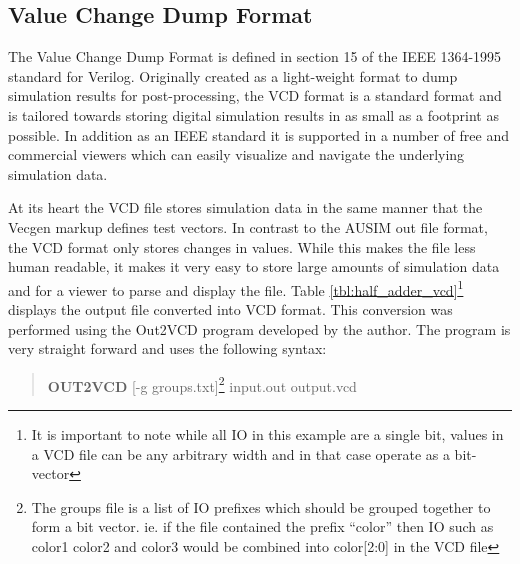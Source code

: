 \documentclass[12pt]{report}
\begin{document}
\subsection{Value Change Dump Format}
The Value Change Dump Format is defined in section 15 of the IEEE 1364-1995 standard for Verilog\cite{verilog}.  Originally created as a light-weight format to dump simulation results for post-processing\cite{verilog}, the VCD format is a standard format and is tailored towards storing digital simulation results in as small as a footprint as possible.  In addition as an IEEE standard it is supported in a number of free and commercial viewers which can easily visualize and navigate the underlying simulation data.

At its heart the VCD file stores simulation data in the same manner that the Vecgen markup defines test vectors.  In contrast to the AUSIM out file format, the VCD format only stores changes in values\cite{verilog}.  While this makes the file less human readable, it makes it very easy to store large amounts of simulation data and for a viewer to parse and display the file.  Table \ref{tbl:half_adder_vcd}\footnote{It is important to note while all IO in this example are a single bit, values in a VCD file can be any arbitrary width and in that case operate as a bit-vector} displays the output file converted into VCD format.  This conversion was performed using the Out2VCD program developed by the author.  The program is very straight forward and uses the following syntax:
\begin{quote}
	\textbf{OUT2VCD} [-g groups.txt]\footnote{The groups file is a list of IO prefixes which should be grouped together to form a bit vector.  ie. if the file contained the prefix ``color'' then IO such as color1 color2 and color3 would be combined into color[2:0] in the VCD file} input.out output.vcd
\end{quote}
\end{document}
